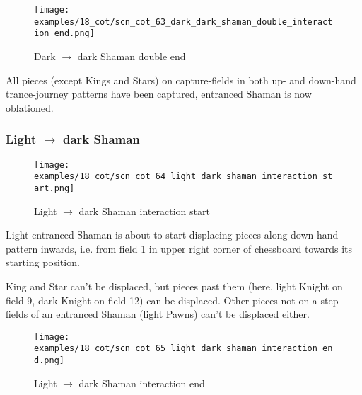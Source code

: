 \noindent
\begin{figure}[!h]
\texttt{[image: examples/18\_cot/scn\_cot\_63\_dark\_dark\_shaman\_double\_interaction\_end.png]}
\caption{Dark $\rightarrow$ dark Shaman double end}
\label{fig:scn_cot_63_dark_dark_shaman_double_interaction_end}
\end{figure}

All pieces (except Kings and Stars) on capture-fields in both up- and down-hand
trance-journey patterns have been captured, entranced Shaman is now oblationed.

\clearpage %

\subsubsection*{Light $\rightarrow$ dark Shaman}
\label{sec:Conquest of Tlalocan/Trance-journey/Interactions/Light --> dark Shaman}

\vspace*{-1.5\baselineskip}
\noindent
\begin{figure}[!h]
\texttt{[image: examples/18\_cot/scn\_cot\_64\_light\_dark\_shaman\_interaction\_start.png]}
\vspace*{-1.4\baselineskip}
\caption{Light $\rightarrow$ dark Shaman interaction start}
\label{fig:scn_cot_64_light_dark_shaman_interaction_start}
\end{figure}

\vspace*{-0.5\baselineskip}
Light-entranced Shaman is about to start displacing pieces along down-hand pattern
inwards, i.e. from field 1 in upper right corner of chessboard towards its starting
position.

King and Star can't be displaced, but pieces past them (here, light Knight on field 9,
dark Knight on field 12) can be displaced. Other pieces not on a step-fields of an
entranced Shaman (light Pawns) can't be displaced either.

\clearpage %

\noindent
\begin{figure}[!h]
\texttt{[image: examples/18\_cot/scn\_cot\_65\_light\_dark\_shaman\_interaction\_end.png]}
\caption{Light $\rightarrow$ dark Shaman interaction end}
\label{fig:scn_cot_65_light_dark_shaman_interaction_end}
\end{figure}

